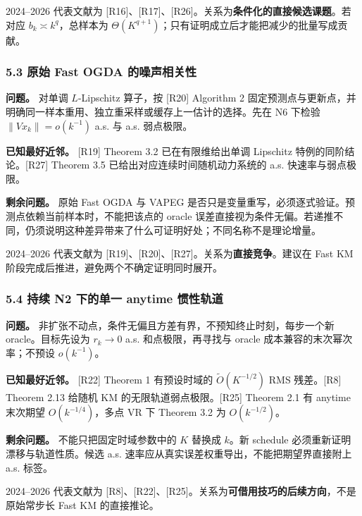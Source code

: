 \documentclass[
  chinese,
  10pt,
  a4paper,
]{article}
\begin{document}
2024--2026 代表文献为
{[}R16{]}、{[}R17{]}、{[}R26{]}。关系为\textbf{条件化的直接候选课题}。若对应
\(b_k\asymp k^q\)，总样本为
\(\Theta(K^{q+1})\)；只有证明成立后才能把减少的批量写成贡献。

\subsubsection{5.3 原始 Fast OGDA
的噪声相关性}\label{ux539fux59cb-fast-ogda-ux7684ux566aux58f0ux76f8ux5173ux6027}

\textbf{问题。} 对单调 \(L\)-Lipschitz 算子，按 {[}R20{]} Algorithm 2
固定预测点与更新点，并明确同一样本重用、独立重采样或缓存上一估计的选择。先在
N6 下检验 \(\lVert Vx_k\rVert=o(k^{-1})\) a.s. 与 a.s. 弱点极限。

\textbf{已知最好近邻。} {[}R19{]} Theorem 3.2 已在有限维给出单调
Lipschitz 特例的同阶结论。{[}R27{]} Theorem 3.5
已给出对应连续时间随机动力系统的 a.s. 快速率与弱点极限。

\textbf{剩余问题。} 原始 Fast OGDA 与 VAPEG
是否只是变量重写，必须逐式验证。预测点依赖当前样本时，不能把该点的
oracle
误差直接视为条件无偏。若递推不同，仍须说明这种差异带来了什么可证明好处；不同名称不是理论增量。

2024--2026 代表文献为
{[}R19{]}、{[}R20{]}、{[}R27{]}。关系为\textbf{直接竞争}。建议在 Fast KM
阶段完成后推进，避免两个不确定证明同时展开。

\subsubsection{5.4 持续 N2 下的单一 anytime
惯性轨道}\label{ux6301ux7eed-n2-ux4e0bux7684ux5355ux4e00-anytime-ux60efux6027ux8f68ux9053}

\textbf{问题。}
非扩张不动点，条件无偏且方差有界，不预知终止时刻，每步一个新
oracle。目标先设为 \(r_k\to0\) a.s. 和点极限，再寻找与 oracle
成本兼容的末次幂次率；不预设 \(o(k^{-1})\)。

\textbf{已知最好近邻。} {[}R22{]} Theorem 1 有预设时域的
\(\widetilde O(K^{-1/2})\) RMS 残差。{[}R8{]} Theorem 2.13 给随机 KM
的无限轨道弱点极限。{[}R25{]} Theorem 2.1 有 anytime 末次期望
\(O(k^{-1/4})\)，多点 VR 下 Theorem 3.2 为 \(O(k^{-1/2})\)。

\textbf{剩余问题。} 不能只把固定时域参数中的 \(K\) 替换成 \(k\)。新
schedule 必须重新证明漂移与轨道性质。候选 a.s.
速率应从真实误差权重导出，不能把期望界直接附上 a.s. 标签。

2024--2026 代表文献为
{[}R8{]}、{[}R22{]}、{[}R25{]}。关系为\textbf{可借用技巧的后续方向}，不是原始常步长
Fast KM 的直接推论。
\end{document}
